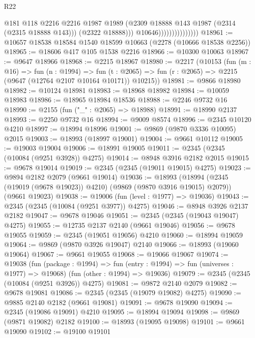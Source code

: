 \begin{lexlean}{R22}
\begin{coremodule}
                                      @181
                                      @118
                                      @2216
                                      @2216
                                      @1987
                                      @1989
                                      (@2309 @18888 @143 @1987 (@2314 (@2315 @18888 @143)))
                                      (@2322 @18888)))
                                  @10646)))))))))))))))
@18961 := @10657 @18538 @18584 @1540 @18599 @10663 (@2278 (@10666 @18538 @2256))
@18965 := @18606 @417 @105 @1538 @2216
@18966 := @10300 @10063
@18967 := @9647 @18966
@18968 := @2215 @18967
@18980 := @2217
    (@10153
      (fun (m : @16) =>
      fun (n : @1994) =>
      fun (t : @2065) => fun (r : @2065) => @2215 (@9647 (@12764 @2107 @10164 @10171)) @10215))
@18981 := @9866 @18980
@18982 := @10124 @18981
@18983 := @18968 @18982
@18984 := @10059 @18983
@18986 := @18965 @18984 @18536
@18988 := @2246 @9732 @16
@18990 := @2155 (fun ("_" : @2065) => @18988)
@18991 := @18990 @2137
@18993 := @2250 @9732 @16
@18994 := @9009 @8574
@18996 := @2345 @10120 @4210
@18997 := @18994 @18996
@19001 := @9869 (@9870 @3336 @10095) @2015
@19003 := @18993 (@18997 @19001)
@19004 := @9661 @10112
@19005 := @19003 @19004
@19006 := @18991 @19005
@19011 := @2345 (@2345 (@10084 (@9251 @3928)) @4275)
@19014 := @8948 @3916 @2182 @2015
@19015 := @9678 @19014
@19019 := @2345 (@2345 (@19011 @19015) @4275)
@19023 := @9894 @2182 @2079 (@9661 @19014)
@19036 := @18993
    (@18994 (@2345 (@19019 (@9678 @19023)) @4210) (@9869 (@9870 @3916 @19015) @2079))
    (@9661 @19023)
@19038 := @19006 (fun (level : @1977) => @19036)
@19043 := @2345 (@2345 (@10084 (@9251 @3977)) @4275)
@19046 := @8948 @3926 @2137 @2182
@19047 := @9678 @19046
@19051 := @2345 (@2345 (@19043 @19047) @4275)
@19055 := @12735 @2137 @2140 (@9661 @19046)
@19056 := @9678 @19055
@19059 := @2345 (@19051 @19056) @4210
@19060 := @18994 @19059
@19064 := @9869 (@9870 @3926 @19047) @2140
@19066 := @18993 (@19060 @19064)
@19067 := @9661 @19055
@19068 := @19066 @19067
@19074 := @19038
    (fun (package : @1994) => fun (entry : @1994) => fun (universes : @1977) => @19068)
    (fun (other : @1994) => @19036)
@19079 := @2345 (@2345 (@10084 (@9251 @3926)) @4275)
@19081 := @9872 @2140 @2079
@19082 := @9678 @19081
@19086 := @2345 (@2345 (@19079 @19082) @4275)
@19090 := @9885 @2140 @2182 (@9661 @19081)
@19091 := @9678 @19090
@19094 := @2345 (@19086 @19091) @4210
@19095 := @18994 @19094
@19098 := @9869 (@9871 @19082) @2182
@19100 := @18993 (@19095 @19098)
@19101 := @9661 @19090
@19102 := @19100 @19101

\end{coremodule}
\end{lexlean}

